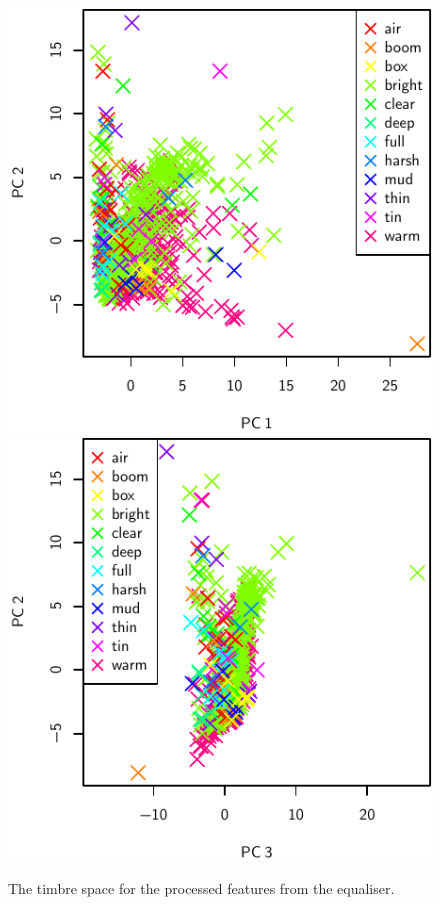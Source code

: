 			\begin{figure}[h!]
				\centering
				\subfloat
				{
					\includegraphics{chapter4/Images/EqualiserProcessedPCA1-2.pdf}
					\label{fig:EqualiserProcessedPCA1-2}
				}
				\quad
				\subfloat
				{
					\includegraphics{chapter4/Images/EqualiserProcessedPCA3-2.pdf}
					\label{fig:EqualiserProcessedPCA3-2}
				}
				\caption{The timbre space for the processed features from the equaliser.}
				\label{fig:EqualiserProcessedPCAs}
			\end{figure}

